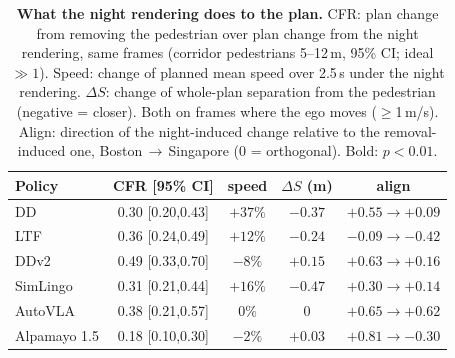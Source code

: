 \begin{table}[t]
\centering
\caption{\textbf{What the night rendering does to the plan.} CFR: plan change from removing the pedestrian over plan change from the night rendering, same frames (corridor pedestrians 5--12\,m, 95\% CI; ideal $\gg1$). Speed: change of planned mean speed over 2.5\,s under the night rendering. $\Delta S$: change of whole-plan separation from the pedestrian (negative = closer). Both on frames where the ego moves ($\ge$1\,m/s). Align: direction of the night-induced change relative to the removal-induced one, Boston\,$\to$\,Singapore (0 = orthogonal). Bold: $p<0.01$.}
\label{tab:light}
\footnotesize
\setlength{\tabcolsep}{3pt}
\begin{tabular}{@{}lcccc@{}}
\toprule
Policy & CFR [95\% CI] & speed & $\Delta S$ (m) & align \\
\midrule
DD & 0.30 {\scriptsize[0.20,0.43]} & \textbf{\boldmath $+37\%$} & \textbf{\boldmath $-0.37$} & $+0.55\to+0.09$ \\
LTF & 0.36 {\scriptsize[0.24,0.49]} & \textbf{\boldmath $+12\%$} & \textbf{\boldmath $-0.24$} & $-0.09\to-0.42$ \\
DDv2 & 0.49 {\scriptsize[0.33,0.70]} & \textbf{\boldmath $-8\%$} & \textbf{\boldmath $+0.15$} & $+0.63\to+0.16$ \\
SimLingo & 0.31 {\scriptsize[0.21,0.44]} & \textbf{\boldmath $+16\%$} & \textbf{\boldmath $-0.47$} & $+0.30\to+0.14$ \\
AutoVLA & 0.38 {\scriptsize[0.21,0.57]} & $0\%$ & $0$ & $+0.65\to+0.62$ \\
Alpamayo 1.5 & 0.18 {\scriptsize[0.10,0.30]} & $-2\%$ & $+0.03$ & $+0.81\to-0.30$ \\
\bottomrule
\end{tabular}
\end{table}
